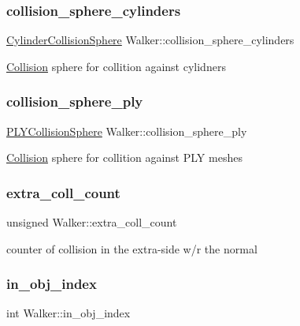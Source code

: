 \subsubsection{\texorpdfstring{collision\+\_\+sphere\+\_\+cylinders}{collision\_sphere\_cylinders}}
{\footnotesize\ttfamily \hyperlink{class_cylinder_collision_sphere}{Cylinder\+Collision\+Sphere} Walker\+::collision\+\_\+sphere\+\_\+cylinders}

\hyperlink{class_collision}{Collision} sphere for collition against cylidners \mbox{\label{class_walker_a8aecfb76c9007eb6da99b024bc5e425d}} 
\subsubsection{\texorpdfstring{collision\+\_\+sphere\+\_\+ply}{collision\_sphere\_ply}}
{\footnotesize\ttfamily \hyperlink{class_p_l_y_collision_sphere}{P\+L\+Y\+Collision\+Sphere} Walker\+::collision\+\_\+sphere\+\_\+ply}

\hyperlink{class_collision}{Collision} sphere for collition against P\+LY meshes \mbox{\label{class_walker_a28c595f6f6b4c32bed6afb177c0a6608}} 
\subsubsection{\texorpdfstring{extra\+\_\+coll\+\_\+count}{extra\_coll\_count}}
{\footnotesize\ttfamily unsigned Walker\+::extra\+\_\+coll\+\_\+count}

counter of collision in the extra-\/side w/r the normal \mbox{\label{class_walker_adf221f7a635c09cfaafc0dab5aa38106}} 
\subsubsection{\texorpdfstring{in\+\_\+obj\+\_\+index}{in\_obj\_index}}
{\footnotesize\ttfamily int Walker\+::in\+\_\+obj\+\_\+index}

